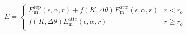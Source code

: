 \documentclass[12pt]{article}
\begin{document}
$$
 E =
  \begin{cases}
       E_\text{m}^{\text{rep}} (\epsilon,\alpha,r) +  f(K,\Delta \theta) E_\text{m}^\text{attr}(\epsilon,\alpha,r) & r < r_o\\
         f( K,\Delta\theta)  E_\text{m}^\text{attr}(\epsilon,\alpha,r) & r \geq r_o \\
          \end{cases} 
$$
\end{document}
